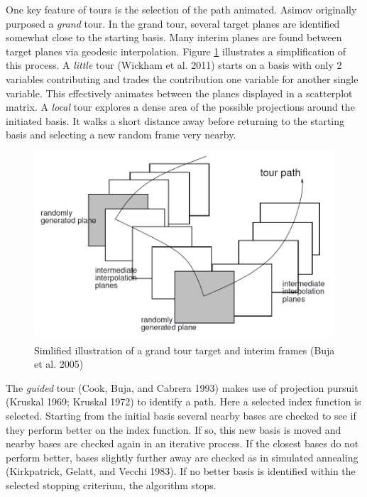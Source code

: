 \documentclass[11,]{article}
\theoremstyle{definition}
\theoremstyle{definition}
\theoremstyle{definition}
\theoremstyle{remark}
\begin{document}
One key feature of tours is the selection of the path animated. Asimov
originally purposed a \emph{grand} tour. In the grand tour, several
target planes are identified somewhat close to the starting basis. Many
interim planes are found between target planes via geodesic
interpolation. Figure \ref{fig:grandFrames} illustrates a simplification
of this process. A \emph{little} tour (Wickham et al. 2011) starts on a
basis with only 2 variables contributing and trades the contribution one
variable for another single variable. This effectively animates between
the planes displayed in a scatterplot matrix. A \emph{local} tour
explores a dense area of the possible projections around the initiated
basis. It walks a short distance away before returning to the starting
basis and selecting a new random frame very nearby.

\begin{figure}

{\centering \includegraphics[width=0.8\linewidth]{figures/buja05fig} 

}

\caption{Simlified illustration of a grand tour target and interim frames  (Buja et al. 2005)}\label{fig:grandFrames}
\end{figure}

The \emph{guided} tour (Cook, Buja, and Cabrera 1993) makes use of
projection pursuit (Kruskal 1969; Kruskal 1972) to identify a path. Here
a selected index function is selected. Starting from the initial basis
several nearby bases are checked to see if they perform better on the
index function. If so, this new basis is moved and nearby bases are
checked again in an iterative process. If the closest bases do not
perform better, bases slightly further away are checked as in simulated
annealing (Kirkpatrick, Gelatt, and Vecchi 1983). If no better basis is
identified within the selected stopping criterium, the algorithm stops.
\end{document}
